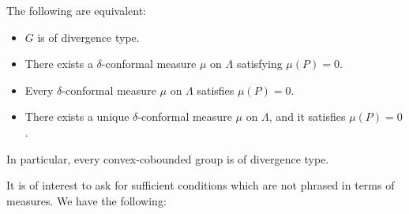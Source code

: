 \begin{observation}
\label{observationnonatomic}
The following are equivalent:
\begin{itemize}
\item[(A)] $G$ is of divergence type.
\item[(B)] There exists a $\delta$-conformal measure $\mu$ on $\Lambda$ satisfying $\mu(P) = 0$.
\item[(C)] Every $\delta$-conformal measure $\mu$ on $\Lambda$ satisfies $\mu(P) = 0$.
\item[(D)] There exists a unique $\delta$-conformal measure $\mu$ on $\Lambda$, and it satisfies $\mu(P) = 0$.
\end{itemize}
In particular, every convex-cobounded group is of divergence type.
\end{observation}

It is of interest to ask for sufficient conditions which are not phrased in terms of measures. We have the following:

